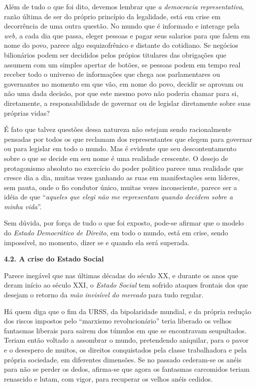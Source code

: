 Além de tudo o que foi dito, devemos lembrar que \emph{a democracia
representativa}, razão última de ser do próprio princípio da legalidade,
está em crise em decorrência de uma outra questão. No mundo que é
informado e interage pela \emph{web,} a cada dia que passa, eleger
pessoas e pagar seus salarios para que falem em nome do povo, parece
algo esquizofrênico e distante do cotidiano. Se negócios bilionários
podem ser decididos pelos própios titulares das obrigações que assumem
com um simples apertar de botões, se pessoas podem em tempo real receber
todo o universo de informações que chega aos parlamentares ou
governantes no momento em que vão, em nome do povo, decidir se aprovam
ou não uma dada decisão, por que este mesmo povo não poderia chamar para
si, diretamente, a responsabilidade de governar ou de legislar
diretamente sobre suas próprias vidas?

É fato que talvez questões dessa natureza não estejam sendo
racionalmente pensadas por todos os que reclamam dos representantes que
elegem para governar ou para legislar em todo o mundo. Mas é evidente
que seu descontentamento sobre o que se decide em seu nome é uma
realidade crescente. O desejo de protagonismo absoluto no exercício do
poder politico parece uma realidade que cresce dia a dia, muitas vezes
ganhando as ruas em manifestações sem líderes, sem pauta, onde o fio
condutor único, muitas vezes inconsciente, parece ser a idéia de que
``\emph{aqueles que elegi não me representam quando decidem sobre a
minha vida}''.

Sem dúvida, por força de tudo o que foi exposto, pode-se afirmar que o
modelo do \emph{Estado Democrático de Direito}, em todo o mundo, está em
crise, sendo impossível, no momento, dizer se e quando ela será
superada.

\textbf{4.2. A crise do Estado Social}

Parece inegável que nas últimas décadas do século XX, e durante os anos
que deram início ao século XXI, o \emph{Estado Social} tem sofrido
ataques frontais dos que desejam o retorno da \emph{mão invisível do
mercado} para tudo regular.

Há quem diga que o fim da URSS, da bipolaridade mundial, e da própria
redução dos riscos impostos pelo ``marxismo revolucionário'' teria
liberado os velhos fantasmas liberais para sairem dos túmulos em que se
encontravam seupultados. Teriam então voltado a assombrar o mundo,
pretendendo aniquilar, para o pavor e o desespero de muitos, os direitos
conquistados pela classe trabalhadora e pela própria sociedade, em
diferentes dimensões. Se no passado cederam-se os anéis para não se
perder os dedos, afirma-se que agora os fantasmas carcomidos teriam
renascido e lutam, com vigor, para recuperar os velhos anéis cedidos.

